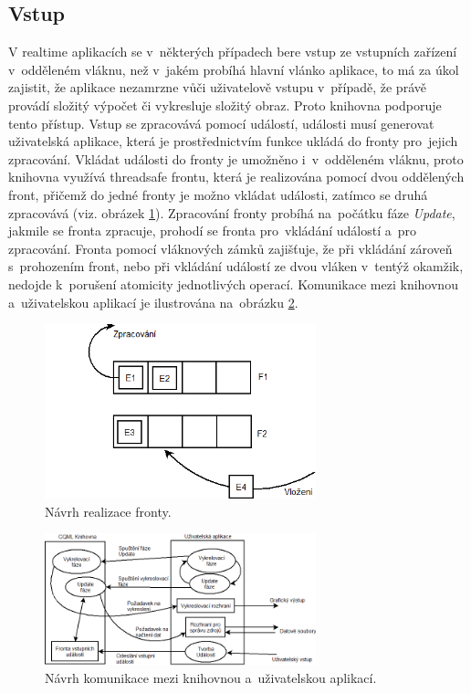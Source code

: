 \documentclass[11pt,twoside,a4paper]{book}
\begin{document}
\subsection {Vstup}
V realtime aplikacích se v~některých případech bere vstup ze vstupních zařízení v~odděleném vláknu, než v~jakém probíhá hlavní vlánko aplikace, to má za úkol zajistit, že aplikace nezamrzne vůči uživatelově vstupu v~případě, že právě provádí složitý výpočet či vykresluje složitý obraz. Proto knihovna podporuje tento přístup. Vstup se zpracovává pomocí událostí, události musí generovat uživatelská aplikace, která je prostřednictvím funkce ukládá do fronty pro~jejich zpracování. Vkládat události do fronty je umožněno i~v~odděleném vláknu, proto knihovna využívá threadsafe frontu, která je realizována pomocí dvou oddělených front, přičemž do jedné fronty je možno vkládat události, zatímco se druhá zpracovává (viz. obrázek \ref{fig:que1N}). Zpracování fronty probíhá na~počátku fáze \textit{Update}, jakmile se fronta zpracuje, prohodí se fronta pro~vkládání událostí a~pro zpracování. Fronta pomocí vláknových zámků zajišťuje, že při vkládání zároveň s~prohozením front, nebo při vkládání událostí ze dvou vláken v~tentýž okamžik, nedojde k~porušení atomicity jednotlivých operací. Komunikace mezi knihovnou a~uživatelskou aplikací je ilustrována na~obrázku \ref{fig:lib1N}.\\
\begin{figure}[!ht]
\begin{center}
  \includegraphics[width=0.7\textwidth]{figures/Diagram5}
\caption{{\label{fig:que1N}}Návrh realizace fronty.}
\end{center}
\end{figure}
\begin{figure}[!ht]
\begin{center}
  \includegraphics[width=0.7\textwidth]{figures/Diagram4}
\caption{{\label{fig:lib1N}}Návrh komunikace mezi knihovnou a~uživatelskou aplikací.}
\end{center}
\end{figure}
\end{document}
